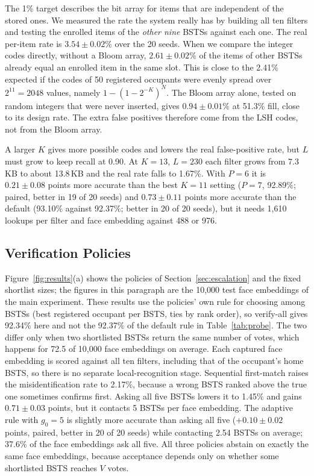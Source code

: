 \documentclass[pdflatex,sn-mathphys-num]{sn-jnl}%
\theoremstyle{thmstyleone}%
\theoremstyle{thmstyletwo}%
\theoremstyle{thmstylethree}%
\begin{document}
The 1\% target describes the bit array for items that are independent of the stored ones. We measured the rate the
system really has by building all ten filters and testing the enrolled items of the \emph{other nine} BSTSs
against each one. The real per-item rate is $3.54 \pm 0.02\%$ over the 20 seeds. When we compare the integer codes
directly, without a Bloom array, $2.61 \pm 0.02\%$ of the items of other BSTSs already equal an enrolled item in the
same slot. This is close to the 2.41\% expected if the codes of 50 registered occupants were evenly spread over
$2^{11}=2048$ values, namely $1-(1-2^{-K})^{N}$. The Bloom array alone, tested on random integers that were never
inserted, gives $0.94 \pm 0.01\%$ at 51.3\% fill, close to its design rate. The extra false positives therefore come
from the LSH codes, not from the Bloom array.

A larger $K$ gives more possible codes and lowers the real false-positive rate, but $L$ must grow to keep recall at
0.90. At $K=13$, $L=230$ each filter grows from 7.3\,KB to about 13.8\,KB and the real rate falls to
1.67\%. With $P=6$ it is $0.21 \pm 0.08$ points more accurate than the best $K=11$ setting ($P=7$,
92.89\%; paired, better in 19 of 20 seeds) and $0.73 \pm 0.11$ points more accurate than the
default (93.10\% against 92.37\%; better in 20 of 20 seeds), but it needs 1,610 lookups
per filter and face embedding against 488 or 976.

\subsection{Verification Policies}
\label{sec:adaptive}

Figure~\ref{fig:results}(a) shows the policies of Section~\ref{sec:escalation} and the fixed shortlist sizes; the figures in this paragraph are the 10,000 test face embeddings of the main experiment. These
results use the policies' own rule for choosing among BSTSs (best registered occupant per BSTS, ties by rank order), so
verify-all gives 92.34\% here and not the 92.37\% of the default rule in Table~\ref{tab:probe}. The two differ
only when two shortlisted BSTSs return the same number of votes, which happens for 72.5 of 10,000 face embeddings on
average. Each captured face embedding is scored against all ten filters, including that of the occupant's home BSTS, so there is no separate local-recognition
stage. Sequential first-match raises the misidentification rate to 2.17\%, because a wrong BSTS ranked above
the true one sometimes confirms first. Asking all five BSTSs lowers it to 1.45\% and gains $0.71 \pm 0.03$ points,
but it contacts 5 BSTSs per face embedding. The adaptive rule with $g_0=5$ is slightly more accurate than asking all
five ($+0.10 \pm 0.02$ points, paired, better in 20 of 20 seeds) while contacting 2.54 BSTSs on average;
37.6\% of the face embeddings ask all five. All three policies abstain on exactly the same face embeddings, because acceptance
depends only on whether some shortlisted BSTS reaches $V$ votes.
\end{document}
